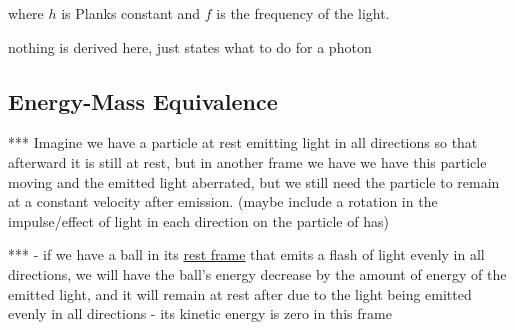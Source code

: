 where $h$ is Planks constant and $f$ is the frequency of the light.

nothing is derived here, just states what to do for a photon

\subsection{Energy-Mass Equivalence}

*** Imagine we have a particle at rest emitting light in all directions so that afterward it is still at rest, but in another frame we have we have this particle moving and the emitted light aberrated, but we still need the particle to remain at a constant velocity after emission. (maybe include a rotation in the impulse/effect of light in each direction on the particle of has)

*** - if we have a ball in its \hyperlink{def-pr oper-frame}{rest frame} that emits a flash of light evenly in all directions, we will have the ball's energy decrease by the amount of energy of the emitted light, and it will remain at rest after due to the light being emitted evenly in all directions
- its kinetic energy is zero in this frame








